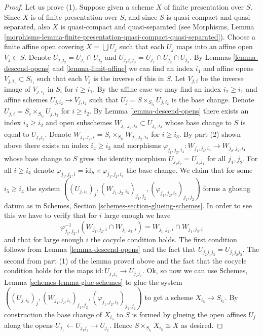 \begin{proof}
\medskip\noindent
Let us prove (1). Suppose given a scheme $X$ of finite presentation
over $S$. Since $X$ is of finite presentation
over $S$, and since $S$ is quasi-compact and quasi-separated, also
$X$ is quasi-compact and quasi-separated
(see Morphisms,
Lemma \ref{morphisms-lemma-finite-presentation-quasi-compact-quasi-separated}).
Choose a finite affine open covering $X = \bigcup U_j$
such that each $U_j$ maps into an affine open $V_j \subset S$.
Denote $U_{j_1j_2} = U_{j_1} \cap U_{j_2}$ and
$U_{j_1j_2j_3} = U_{j_1} \cap U_{j_2} \cap U_{j_3}$.
By Lemmas \ref{lemma-descend-opens} and \ref{lemma-limit-affine}
we can find an index $i_1$ and affine opens $V_{j, i_1} \subset S_{i_1}$
such that each $V_j$ is the inverse of this in $S$.
Let $V_{j, i}$ be the inverse image of $V_{j, i_1}$ in $S_i$ for
$i \geq i_1$. By the affine case we may find an index $i_2 \geq i_1$ and
affine schemes $U_{j, i_2} \to V_{j, i_2}$ such
that $U_j = S \times_{S_{i_2}} U_{j, i_2}$ is the base change.
Denote $U_{j, i} = S_i \times_{S_{i_2}} U_{j, i_2}$ for $i \geq i_2$.
By Lemma \ref{lemma-descend-opens} there exists an index
$i_3 \geq i_2$ and open subschemes
$W_{j_1, j_2, i_3} \subset U_{j_1, i_3}$
whose base change to $S$ is equal to $U_{j_1j_2}$.
Denote $W_{j_1, j_2, i} = S_i \times_{S_{i_3}} W_{j_1, j_2, i_3}$
for $i \geq i_3$. By part (2) shown above there exists an index
$i_4 \geq i_3$ and morphisms
$\varphi_{j_1, j_2, i_4} : W_{j_1, j_2, i_4} \to W_{j_2, j_1, i_4}$
whose base change to $S$ gives the identity morphism
$U_{j_1j_2} = U_{j_2j_1}$ for all $j_1, j_2$.
For all $i \geq i_4$ denote
$\varphi_{j_1, j_2, i} = \text{id}_S \times \varphi_{j_1, j_2, i_4}$
the base change. We claim that for some $i_5 \geq i_4$ the system
$((U_{j, i_5})_j, (W_{j_1, j_2, i_5})_{j_1, j_2},
(\varphi_{j_1, j_2, i_5})_{j_1, j_2})$ forms a glueing datum
as in Schemes, Section \ref{schemes-section-glueing-schemes}.
In order to see this we have to verify that for $i$ large enough
we have
$$
\varphi_{j_1, j_2, i}^{-1}(W_{j_1, j_2, i} \cap W_{j_1, j_3, i})
=
W_{j_1, j_2, i} \cap W_{j_1, j_3, i}
$$
and that for large enough $i$ the cocycle condition holds.
The first condition follows from Lemma \ref{lemma-descend-opens}
and the fact that $U_{j_2j_1j_3} = U_{j_1j_2j_3}$.
The second from part (1) of the lemma proved above and the fact
that the cocycle condition holds for the maps
$\text{id} : U_{j_1j_2} \to U_{j_2j_1}$.
Ok, so now we can use Schemes, Lemma \ref{schemes-lemma-glue-schemes}
to glue the system
$((U_{j, i_5})_j, (W_{j_1, j_2, i_5})_{j_1, j_2},
(\varphi_{j_1, j_2, i_5})_{j_1, j_2})$ to get a scheme
$X_{i_5} \to S_{i_5}$. By construction the base change of
$X_{i_5}$ to $S$ is formed by glueing the open affines
$U_j$ along the opens $U_{j_1} \leftarrow U_{j_1j_2} \rightarrow U_{j_2}$.
Hence $S \times_{S_{i_5}} X_{i_5} \cong X$ as desired.
\end{proof}

